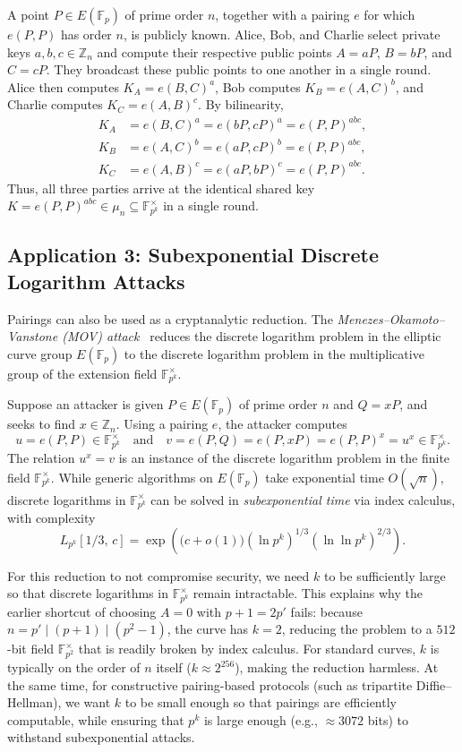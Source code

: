A point \(P \in E(\mathbb{F}_p)\) of prime order \(n\), together with a pairing \(e\) for which \(e(P, P)\) has order \(n\), is publicly known. Alice, Bob, and Charlie select private keys \(a, b, c \in \mathbb{Z}_n\) and compute their respective public points \(A = aP\), \(B = bP\), and \(C = cP\). They broadcast these public points to one another in a single round. Alice then computes \(K_A = e(B, C)^a\), Bob computes \(K_B = e(A, C)^b\), and Charlie computes \(K_C = e(A, B)^c\). By bilinearity,
\begin{align*}
    K_A &= e(B, C)^a = e(bP, cP)^a = e(P, P)^{abc}, \\
    K_B &= e(A, C)^b = e(aP, cP)^b = e(P, P)^{abc}, \\
    K_C &= e(A, B)^c = e(aP, bP)^c = e(P, P)^{abc}.
\end{align*}
Thus, all three parties arrive at the identical shared key \(K = e(P, P)^{abc} \in \mu_n \subseteq \mathbb{F}_{p^k}^\times\) in a single round.

\subsection*{Application 3: Subexponential Discrete Logarithm Attacks}

Pairings can also be used as a cryptanalytic reduction.
The \emph{Menezes--Okamoto\---Vanstone (MOV) attack}~\cite{MenezesOkamotoVanstone1993} reduces the discrete logarithm problem in the elliptic curve group \(E(\mathbb{F}_p)\) to the discrete logarithm problem in the multiplicative group of the extension field \(\mathbb{F}_{p^k}^\times\).

Suppose an attacker is given \(P \in E(\mathbb{F}_p)\) of prime order \(n\) and \(Q = xP\), and seeks to find \(x \in \mathbb{Z}_n\).
Using a pairing \(e\), the attacker computes
\[
    u = e(P, P) \in \mathbb{F}_{p^k}^\times \quad \text{and} \quad v = e(P, Q) = e(P, xP) = e(P, P)^x = u^x \in \mathbb{F}_{p^k}^\times.
\]
The relation \(u^x = v\) is an instance of the discrete logarithm problem in the finite field \(\mathbb{F}_{p^k}^\times\).
While generic algorithms on \(E(\mathbb{F}_p)\) take exponential time \(O(\sqrt{n})\), discrete logarithms in \(\mathbb{F}_{p^k}^\times\) can be solved in \emph{subexponential time} via index calculus, with complexity
\[
    L_{p^k}\left[1/3, \, c\right] = \exp\left( \bigl(c + o(1)\bigr) (\ln p^k)^{1/3} (\ln \ln p^k)^{2/3} \right).
\]

For this reduction to not compromise security, we need \(k\) to be sufficiently large so that discrete logarithms in \(\mathbb{F}_{p^k}^\times\) remain intractable.
This explains why the earlier shortcut of choosing \(A = 0\) with \(p + 1 = 2p'\) fails: because \(n = p' \mid (p + 1) \mid (p^2 - 1)\), the curve has \(k = 2\), reducing the problem to a \(512\)-bit field \(\mathbb{F}_{p^2}^\times\) that is readily broken by index calculus.
For standard curves, \(k\) is typically on the order of \(n\) itself (\(k \approx 2^{256}\)), making the reduction harmless.
At the same time, for constructive pairing-based protocols (such as tripartite Diffie--Hellman), we want \(k\) to be small enough so that pairings are efficiently computable, while ensuring that \(p^k\) is large enough (e.g., \(\approx 3072\) bits) to withstand subexponential attacks.
